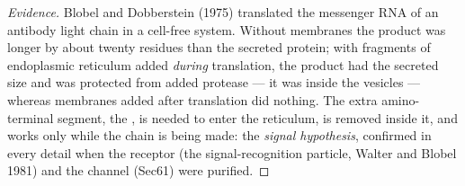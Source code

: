 \begin{proof}[Evidence]
Blobel and Dobberstein (1975) translated the messenger RNA of an
antibody light chain in a cell-free system. Without membranes the
product was longer by about twenty residues than the secreted protein;
with fragments of endoplasmic reticulum added \emph{during} translation,
the product had the secreted size and was protected from added
protease --- it was inside the vesicles --- whereas membranes added
after translation did nothing. The extra amino-terminal segment, the
, is needed to enter the reticulum, is removed inside it,
and works only while the chain is being made: the \emph{signal
hypothesis}, confirmed in every detail when the receptor (the
signal-recognition particle, Walter and Blobel 1981) and the channel
(Sec61) were purified.
\end{proof}

